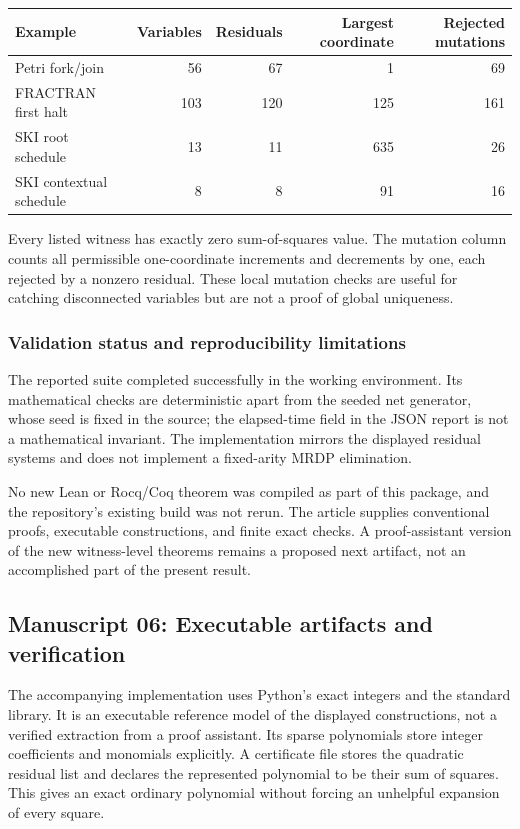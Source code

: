 \documentclass[11pt,a4paper]{article}
\theoremstyle{definition}
\theoremstyle{remark}
\begin{document}
\begin{center}
\small
\begin{tabular}{lrrrr}
\toprule
Example & Variables & Residuals & Largest coordinate & Rejected mutations\\
\midrule
Petri fork/join &56&67&1&69\\
FRACTRAN first halt &103&120&125&161\\
SKI root schedule &13&11&635&26\\
SKI contextual schedule &8&8&91&16\\
\bottomrule
\end{tabular}
\end{center}
Every listed witness has exactly zero sum-of-squares value. The mutation column counts all permissible one-coordinate increments and decrements by one, each rejected by a nonzero residual. These local mutation checks are useful for catching disconnected variables but are not a proof of global uniqueness.

\subsubsection{Validation status and reproducibility limitations}
The reported suite completed successfully in the working environment. Its mathematical checks are deterministic apart from the seeded net generator, whose seed is fixed in the source; the elapsed-time field in the JSON report is not a mathematical invariant. The implementation mirrors the displayed residual systems and does not implement a fixed-arity MRDP elimination.

No new Lean or Rocq/Coq theorem was compiled as part of this package, and the repository's existing build was not rerun. The article supplies conventional proofs, executable constructions, and finite exact checks. A proof-assistant version of the new witness-level theorems remains a proposed next artifact, not an accomplished part of the present result.


\subsection{Manuscript 06: Executable artifacts and verification}
\label{cdc:cs:sec:verification}

The accompanying implementation uses Python's exact integers and the standard
library. It is an executable reference model of the displayed constructions,
not a verified extraction from a proof assistant. Its sparse polynomials store
integer coefficients and monomials explicitly. A certificate file stores the
quadratic residual list and declares the represented polynomial to be their
sum of squares. This gives an exact ordinary polynomial without forcing an
unhelpful expansion of every square.
\end{document}

